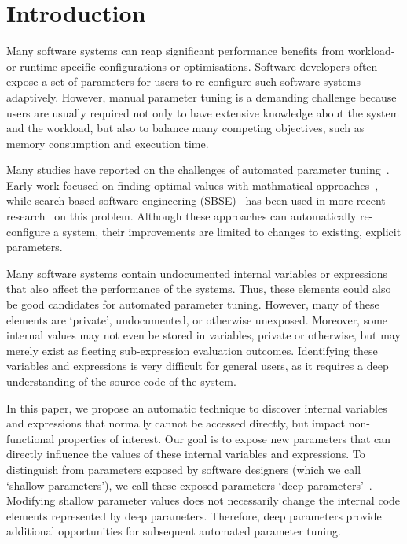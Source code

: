 
\section{Introduction}

Many software systems can reap significant performance benefits from
workload- or runtime-specific configurations or optimisations.
Software developers often expose a set of parameters for users to re-configure such software systems adaptively.
However, manual parameter tuning is a demanding challenge because users are usually required not only to have extensive knowledge about the system and the workload, but also to balance many competing objectives, such as memory consumption and execution time.

Many studies have reported on the challenges of automated parameter tuning~\cite{arcuri-ssbse-2011, Tapus:2002:AHT:762761.762771,Hoffmann:2011:DKR:1950365.1950390, hutter2009paramils,autotuning,Vuduc01statisticalmodels,Whaley:1998:ATL:509058.509096}. Early work focused on finding optimal values with mathmatical approaches~\cite{Tapus:2002:AHT:762761.762771,autotuning,Vuduc01statisticalmodels,Whaley:1998:ATL:509058.509096}, while search-based software engineering (SBSE)~\cite{Harman:2007:CSF:1253532.1254729} has been used in more recent research~\cite{arcuri-ssbse-2011,Hoffmann:2011:DKR:1950365.1950390,hutter2009paramils} on this problem. Although these approaches can automatically re-configure a system, their improvements are limited to changes to existing, explicit parameters.


Many software systems contain undocumented internal variables or
expressions that also affect the performance of the systems. Thus, these
elements could also be good candidates for automated parameter tuning.
However, many of these elements are `private', undocumented, or otherwise
unexposed.
Moreover, some internal values may
not even be stored in variables, private or otherwise, but may merely exist
as fleeting sub-expression evaluation outcomes. Identifying these variables
and expressions is very difficult for general users, as it requires a deep
understanding of the source code of the system. 


In this paper, we propose an automatic technique to discover internal variables and expressions that normally cannot be accessed directly, but impact non-functional properties of interest. Our goal is to expose new parameters that can directly influence the values of these internal variables and expressions. To distinguish from parameters exposed by software designers (which we call `shallow parameters'), we call these exposed parameters `deep parameters'~\cite{Harman:2014:GIA:2593929.2600116}. Modifying shallow parameter values does not necessarily change the internal code elements represented by deep parameters. Therefore, deep parameters provide additional opportunities for subsequent automated parameter tuning.


